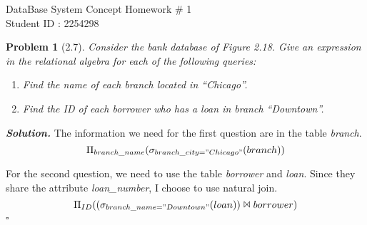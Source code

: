 \documentclass[12pt]{article}
\newtheorem{problem}{Problem}
\newenvironment{solution}[1][\it{Solution}]{\textbf{#1. } }{$\square$}
\begin{document}
\noindent DataBase System Concept \hfill Homework \# 1\\
Student ID : 2254298

\hrulefill


\begin{problem}[2.7]
    Consider the bank database of Figure 2.18. Give an expression in the relational algebra for each of the following queries:
    \begin{enumerate}
        \item Find the name of each branch located in “Chicago”.
        \item Find the ID of each borrower who has a loan in branch “Downtown”.
    \end{enumerate}
\end{problem}
\begin{solution}
    The information we need for the first question are in the table \emph{branch}.
    \[\Pi_{branch\_name}(\sigma_{branch\_city="Chicago"}(branch))\]

    For the second question, we need to use the table \emph{borrower} and \emph{loan}.
    Since they share the attribute \emph{loan\_number}, I choose to use natural join.
    \[\Pi_{ID}((\sigma_{branch\_name="Downtown"}(loan))\Join borrower)\]
\end{solution} 
\end{document}
